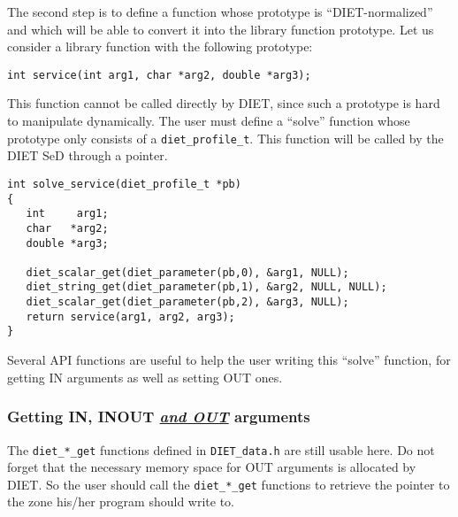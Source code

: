 The second step is to define a function whose prototype is ``DIET-normalized''
and which will be able to convert it into the library function prototype.
Let us consider a library function with the following prototype:
{\footnotesize
\begin{verbatim}
int service(int arg1, char *arg2, double *arg3);
\end{verbatim}
}

This function cannot be called directly by DIET, since such a prototype is hard
to manipulate dynamically. The user must define a ``solve'' function whose
prototype only consists of a \texttt{diet\_profile\_t}.
This function will be called by the DIET SeD through a pointer.
{\footnotesize
\begin{verbatim}
int solve_service(diet_profile_t *pb)
{
   int     arg1;
   char   *arg2;
   double *arg3;

   diet_scalar_get(diet_parameter(pb,0), &arg1, NULL);
   diet_string_get(diet_parameter(pb,1), &arg2, NULL, NULL);
   diet_scalar_get(diet_parameter(pb,2), &arg3, NULL);
   return service(arg1, arg2, arg3);
}
\end{verbatim}
}

Several API functions are useful to help the user writing this ``solve''
function, for getting IN arguments as well as setting OUT ones.

\subsubsection*{Getting IN, INOUT \underline{\emph{and OUT}} arguments}
The \texttt{diet\_*\_get} functions defined in \texttt{DIET\_data.h} are still
usable here. Do not forget that the necessary memory space for OUT arguments is
allocated by DIET. So the user should call the \texttt{diet\_*\_get} functions
to retrieve the pointer to the zone his/her program should write to.

